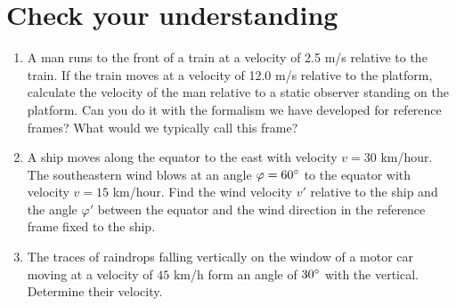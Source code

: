 \documentclass{article}
\begin{document}
\section{Check your understanding}
\begin{enumerate}

\item
A man runs to the front of a train at a velocity of 2.5 m/s relative to the train. If the train moves at a velocity of 12.0 m/s relative to the platform, calculate the velocity of the man relative to a static observer standing on the platform. Can you do it with the formalism we have developed for reference frames? What would we typically call this frame?

\item A ship moves along the equator to the east with velocity $v = 30$ km/hour. The southeastern wind blows at an angle $\varphi = 60\degree$ to the equator with velocity $v = 15$ km/hour. Find the wind velocity $v'$ relative to the ship and the angle $\varphi'$ between the equator and the wind direction in the reference frame fixed to the ship.

\item The traces of raindrops falling vertically on the window of a motor car moving at a velocity of $45$ km/h form an angle of $30\degree$ with the vertical. Determine their velocity.
\end{enumerate}
\end{document}
